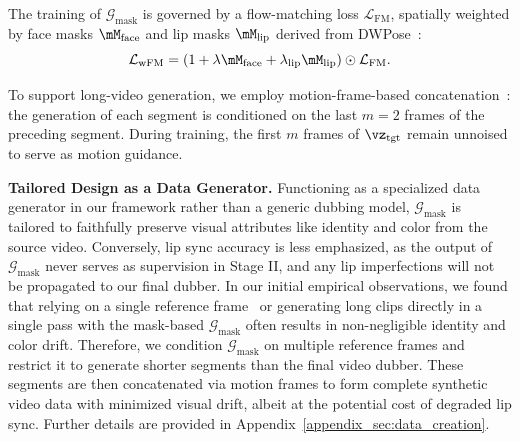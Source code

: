 \documentclass{article}
\newcommand{\myparagraph}[1]{\noindent\textbf{#1}}
\newcommand{\Gmask}{\mathcal{G}_{\text{mask}}}
\theoremstyle{plain}
\theoremstyle{definition}
\theoremstyle{remark}
\begin{document}
The training of $\Gmask$ is governed by a flow-matching loss $\mathcal{L}_{\text{FM}}$, spatially weighted by face masks $\mM_{\text{face}}$ and lip masks $\mM_{\text{lip}}$ derived from DWPose~\citep{yang2023dwpose}:
\begin{equation}
    \mathcal{L}_{\text{wFM}} = (1 + \lambda \mM_{\text{face}} + \lambda_{\text{lip}} \mM_{\text{lip}}) \odot \mathcal{L}_{\text{FM}}.
\label{eq:weighted_loss}
\end{equation}

To support long-video generation, we employ motion-frame-based concatenation~\citep{tian2024emo}: the generation of each segment is conditioned on the last $m=2$ frames of the preceding segment. During training, the first $m$ frames of $\vz_{\text{tgt}}$ remain unnoised to serve as motion guidance.








\myparagraph{Tailored Design as a Data Generator.}
Functioning as a specialized data generator in our framework rather than a generic dubbing model, $\Gmask$ is tailored to faithfully preserve visual attributes like identity and color from the source video.
Conversely, lip sync accuracy is less emphasized, as the output of $\Gmask$ never serves as supervision in Stage II, and any lip imperfections will not be propagated to our final dubber.
In our initial empirical observations, we found that relying on a single reference frame~\citep{li2024latentsync} or generating long clips directly in a single pass with the mask-based $\Gmask$ often results in non-negligible identity and color drift.
Therefore, we condition $\Gmask$ on multiple reference frames and restrict it to generate shorter segments than the final video dubber.
These segments are then concatenated via motion frames to form complete synthetic video data with minimized visual drift, albeit at the potential cost of degraded lip sync.
Further details are provided in Appendix~\ref{appendix_sec:data_creation}.
\end{document}
